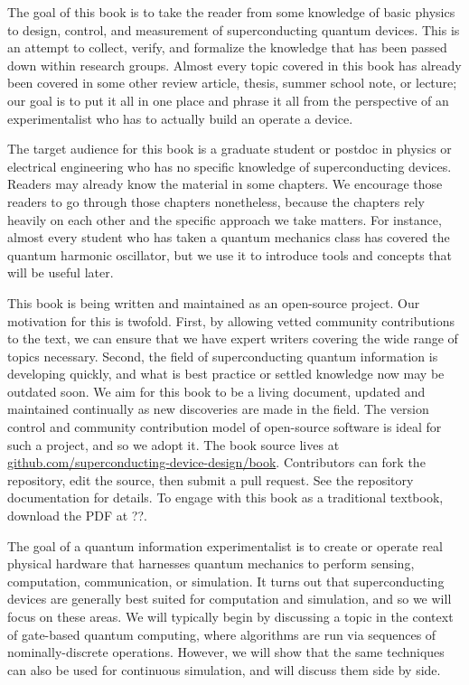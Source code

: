 
The goal of this book is to take the reader from some knowledge of basic physics to design, control, and measurement of superconducting quantum devices.
This is an attempt to collect, verify, and formalize the knowledge that has been passed down within research groups.
Almost every topic covered in this book has already been covered in some other review article, thesis, summer school note, or lecture; our goal is to put it all in one place and phrase it all from the perspective of an experimentalist who has to actually build an operate a device.

The target audience for this book is a graduate student or postdoc in physics or electrical engineering who has no specific knowledge of superconducting devices.
Readers may already know the material in some chapters.
We encourage those readers to go through those chapters nonetheless, because the chapters rely heavily on each other and the specific approach we take matters.
For instance, almost every student who has taken a quantum mechanics class has covered the quantum harmonic oscillator, but we use it to introduce tools and concepts that will be useful later.


This book is being written and maintained as an open-source project.
Our motivation for this is twofold.
First, by allowing vetted community contributions to the text, we can ensure that we have expert writers covering the wide range of topics necessary.
Second, the field of superconducting quantum information is developing quickly, and what is best practice or settled knowledge now may be outdated soon.
We aim for this book to be a living document, updated and maintained continually as new discoveries are made in the field.
The version control and community contribution model of open-source software is ideal for such a project, and so we adopt it.
The book source lives at \href{https://github.com/superconducting-device-design}{github.com/superconducting-device-design/book}.
Contributors can fork the repository, edit the source, then submit a pull request.
See the repository documentation for details.
To engage with this book as a traditional textbook, download the PDF at ??.


The goal of a quantum information experimentalist is to create or operate real physical hardware that harnesses quantum mechanics to perform sensing, computation, communication, or simulation.
It turns out that superconducting devices are generally best suited for computation and simulation, and so we will focus on these areas.
We will typically begin by discussing a topic in the context of gate-based quantum computing, where algorithms are run via sequences of nominally-discrete operations.
However, we will show that the same techniques can also be used for continuous simulation, and will discuss them side by side.

